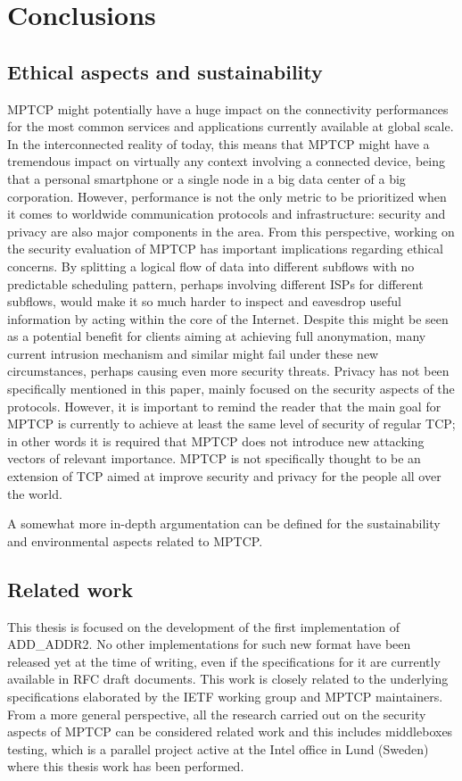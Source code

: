 \chapter{Conclusions}
\label{chap:conclusions}

\section{Ethical aspects and sustainability}
MPTCP might potentially have a huge impact on the connectivity performances for the most common services and applications currently available at global scale. In the interconnected reality of today, this means that MPTCP might have a tremendous impact on virtually any context involving a connected device, being that a personal smartphone or a single node in a big data center of a big corporation. 
However, performance is not the only metric to be prioritized when it comes to worldwide communication protocols and infrastructure: security and privacy are also major components in the area. From this perspective, working on the security evaluation of MPTCP has important implications regarding ethical concerns.
By splitting a logical flow of data into different subflows with no predictable scheduling pattern, perhaps involving different ISPs for different subflows, would make it so much harder to inspect and eavesdrop useful information by acting within the core of the Internet. Despite this might be seen as a potential benefit for clients aiming at achieving full anonymation, many current intrusion mechanism and similar might fail under these new circumstances, perhaps causing even more security threats.
Privacy has not been specifically mentioned in this paper, mainly focused on the security aspects of the protocols. However, it is important to remind the reader that the main goal for MPTCP is currently to achieve at least the same level of security of regular TCP; in other words it is required that MPTCP does not introduce new attacking vectors of relevant importance. MPTCP is not specifically thought to be an extension of TCP aimed at improve security and privacy for the people all over the world.

A somewhat more in-depth argumentation can be defined for the sustainability and environmental aspects related to MPTCP.
 

\section{Related work}
This thesis is focused on the development of the first implementation of ADD\_ADDR2. No other implementations for such new format have been released yet at the time of writing, even if the specifications for it are currently available in RFC draft documents. This work is closely related to the underlying specifications elaborated by the IETF working group and MPTCP maintainers. From a more general perspective, all the research carried out on the security aspects of MPTCP can be considered related work and this includes middleboxes testing, which is a parallel project active at the Intel office in Lund (Sweden) where this thesis work has been performed. 

